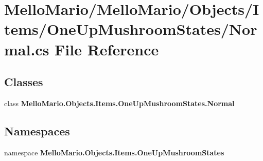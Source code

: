 \section{Mello\+Mario/\+Mello\+Mario/\+Objects/\+Items/\+One\+Up\+Mushroom\+States/\+Normal.cs File Reference}
\label{Items_2OneUpMushroomStates_2Normal_8cs}
\subsection*{Classes}
\begin{DoxyCompactItemize}
\item 
class \textbf{ Mello\+Mario.\+Objects.\+Items.\+One\+Up\+Mushroom\+States.\+Normal}
\end{DoxyCompactItemize}
\subsection*{Namespaces}
\begin{DoxyCompactItemize}
\item 
namespace \textbf{ Mello\+Mario.\+Objects.\+Items.\+One\+Up\+Mushroom\+States}
\end{DoxyCompactItemize}
